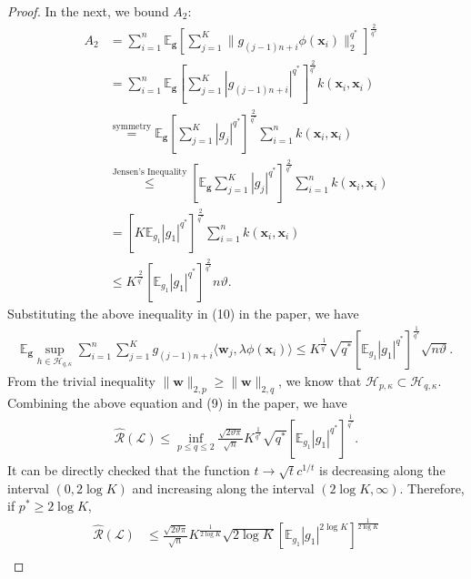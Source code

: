 \documentclass{article}
\begin{document}
\begin{proof}
  In the next, we bound $A_2$:
  \begin{align*}
    A_2&=\sum_{i=1}^n\mathbb{E}_{\bm g}\left[\sum_{j=1}^K\|g_{(j-1)n+i}\phi(\mathbf x_i)\|_2^{q^\ast}\right]^{\frac{2}{q^\ast}}\\
    &=\sum_{i=1}^n\mathbb{E}_{\bm g}\left[\sum_{j=1}^K|g_{(j-1)n+i}|^{q^\ast}\right]^{\frac{2}{q^\ast}}k(\mathbf x_i,\mathbf x_i)\\
    &\overset{\text{symmetry}}{=}\mathbb{E}_{\bm g}\left[\sum_{j=1}^K|g_{j}|^{q^\ast}\right]^{\frac{2}{q^\ast}}\sum_{i=1}^nk(\mathbf x_i,\mathbf x_i)\\
    &\overset{\text{Jensen's Inequality}}{\leq}
    \left[\mathbb{E}_{\bm g} \sum_{j=1}^K|g_{j}|^{q^\ast}\right]^{\frac{2}{q^\ast}}\sum_{i=1}^nk(\mathbf x_i,\mathbf x_i)\\
    &=\left[K\mathbb{E}_{g_1}|g_1|^{q^\ast}\right]^{\frac{2}{q^\ast}}\sum_{i=1}^nk(\mathbf x_i,\mathbf x_i)\\
    &\leq K^{\frac{2}{q^\ast}}\left[\mathbb{E}_{g_1}|g_1|^{q^\ast}\right]^{\frac{2}{q^\ast}}n\vartheta.
  \end{align*}
  Substituting the above inequality in \textrm{(10)} in the paper, we have
  \begin{align*}
    \mathbb{E}_{\bm g}\sup_{h\in \mathcal{H}_{q,\kappa}}\sum_{i=1}^n\sum_{j=1}^Kg_{(j-1)n+i}\langle \mathbf w_j,\lambda \phi(\mathbf x_i)\rangle
    \leq  K^{\frac{1}{q^\ast}}\sqrt{q^\ast}\left[\mathbb{E}_{g_1}|g_1|^{q^\ast}\right]^\frac{1}{q^\ast}\sqrt{n\vartheta}.
  \end{align*}
  From the trivial inequality $\|\mathbf w\|_{2,p}\geq \|\mathbf w\|_{2,q}$,
  we know that $\mathcal{H}_{p,\kappa}\subset \mathcal{H}_{q,\kappa}$.
  Combining the above  equation and \textrm{(9)} in the paper,
  we have
  \begin{align*}
    \hat{\mathcal{R}}(\mathcal{L})\leq\inf_{p\leq q\leq 2}\frac{\sqrt{2\vartheta\pi}}{\sqrt{n}} K^{\frac{1}{q^\ast}}\sqrt{q^\ast}
    \left[\mathbb{E}_{g_1}|g_1|^{q^\ast}\right]^\frac{1}{q^\ast}.
  \end{align*}
  It can be directly checked that the function $t\rightarrow \sqrt{t}c^{1/t}$ is decreasing along the interval $(0,2\log K)$
  and increasing along the interval $(2\log K,\infty)$.
  Therefore, if $p^\ast\geq 2\log K$,
  \begin{align}
  \label{eq-hai}
    \nonumber\hat{\mathcal{R}}(\mathcal{L})&\leq \frac{\sqrt{2\vartheta\pi}}{\sqrt{n}} K^{\frac{1}{2\log K }}\sqrt{2\log K}
     \left[\mathbb{E}_{g_1}|g_1|^{2\log K}\right]^\frac{1}{2\log K}\\

\end{align}
\end{proof}
\end{document}
